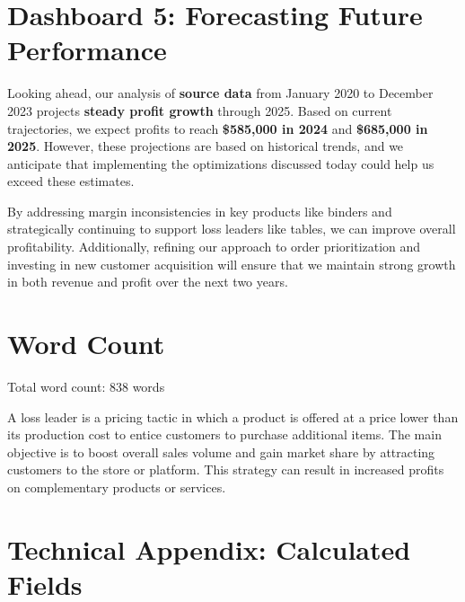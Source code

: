 \documentclass[12pt,a4paper]{article}
\begin{document}
\restoregeometry

\newpage

\section{Dashboard 5: Forecasting Future Performance}

Looking ahead, our analysis of \textbf{source data} from January 2020 to December 2023 projects \textbf{steady profit growth} through 2025. Based on current trajectories, we expect profits to reach \textbf{\$585,000 in 2024} and \textbf{\$685,000 in 2025}. However, these projections are based on historical trends, and we anticipate that implementing the optimizations discussed today could help us exceed these estimates.

By addressing margin inconsistencies in key products like binders and strategically continuing to support loss leaders like tables, we can improve overall profitability. Additionally, refining our approach to order prioritization and investing in new customer acquisition will ensure that we maintain strong growth in both revenue and profit over the next two years.

\newpage

\section*{Word Count}
Total word count: 838 words

\vspace*{2cm}

\begin{tcolorbox}[colback=white!10!white, colframe=blue!75!black, title= Loss Leader, sharp corners=southwest, enhanced]
A loss leader is a pricing tactic in which a product is offered at a price lower than its production cost to entice customers to purchase additional items. The main objective is to boost overall sales volume and gain market share by attracting customers to the store or platform. This strategy can result in increased profits on complementary products or services.
\end{tcolorbox}

\vspace*{2cm}

\section{Technical Appendix: Calculated Fields}
\end{document}
